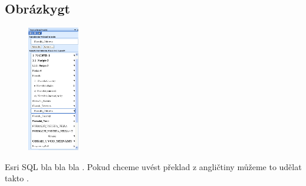  \subsection{Obrázkygt}

    \begin{figure}[H]
      \centering
      \includegraphics[width=0.2\textwidth]{./obrazky/obrazek_1.png}
      \label{fig:44}
    \end{figure}

    \gls{Esri} \gls{SQL} bla bla bla . Pokud chceme uvést překlad z angličtiny můžeme to udělat takto .

